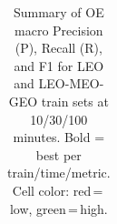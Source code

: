 \begin{table}[t]
{\begin{tabular}{l ccc ccc ccc ccc ccc ccc}
\bottomrule
\end{tabular}%
}
\caption{Summary of OE macro Precision (P), Recall (R), and F1 for LEO and LEO-MEO-GEO train sets at 10/30/100 minutes. Bold = best per train/time/metric. Cell color: red\,=\,low, green\,=\,high.}
\label{tab:class_leo_combined_oe}
\end{table}
